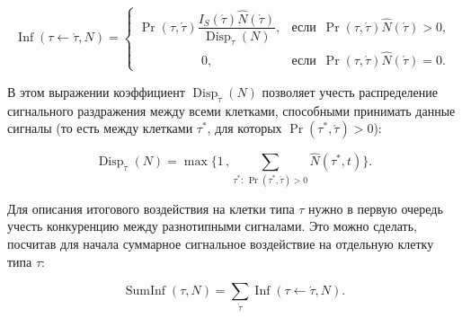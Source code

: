 %	

\begin{equation} %

\label{nazarov:coarse:delta_eq13}

\operatorname{Inf}(\tau \leftarrow \acute{\tau},N) = \begin{cases}

	 	\operatorname{Pr}(\tau,\acute{\tau}) 

		\dfrac{I_{S}(\acute{\tau}) \hat{N}(\acute{\tau})}

				{\operatorname{Disp}_{\acute{\tau}}(N)}, & \text{если } \, \operatorname{Pr}(\tau,\acute{\tau})\hat{N}(\acute{\tau}) >0, \\

\qquad \qquad \quad 		0 , & \text{если  } \, \operatorname{Pr}(\tau,\acute{\tau})\hat{N}(\acute{\tau}) =0.

		\end{cases}	

\end{equation}	

%

В этом выражении коэффициент $\operatorname{Disp}_{\acute{\tau}}(N)$ позволяет учесть распределение сигнального раздражения между всеми клетками, способными принимать данные сигналы (то есть между  клетками ${\tau}^{*}$, для которых   $\operatorname{Pr}({\tau}^{*},\acute{\tau})>0$):

\begin{equation} %

\label{nazarov:coarse:delta_eq13}

\operatorname{Disp}_{\acute{\tau}}(N) = \max  

\biggl\lbrace 1 \, , \! \! \sum_{{\tau}^{*}: \, \operatorname{Pr}({\tau}^{*},\acute{\tau})>0} \! \! \hat{N}({\tau}^{*},t) \biggr\rbrace.

\end{equation}	

%

Для описания итогового воздействия на клетки типа $\tau$ нужно в первую очередь учесть конкуренцию между разнотипными сигналами. Это можно сделать, посчитав для начала суммарное сигнальное воздействие на отдельную клетку типа $\tau$:

%

\begin{equation} %

\label{nazarov:coarse:delta_eq13}

	\operatorname{SumInf}(\tau,N) = \sum_{\acute{\tau}} \operatorname{Inf}(\tau \leftarrow \acute{\tau},N).

\end{equation}		

